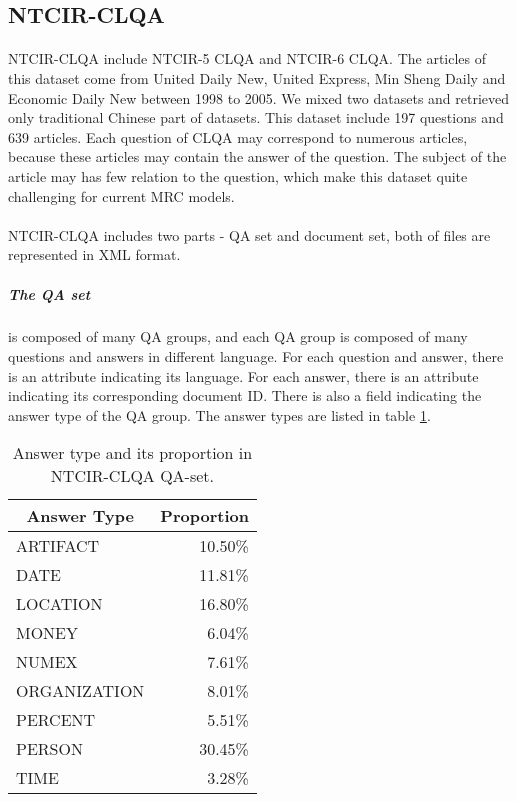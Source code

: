 \documentclass{article}
\begin{document}
\subsection{NTCIR-CLQA}
\paragraph{}
NTCIR-CLQA include NTCIR-5 CLQA\cite{sasaki2005ntcir5} and NTCIR-6\cite{sasaki2005ntcir6} CLQA. The articles of this dataset come from United Daily New, United Express, Min Sheng Daily and Economic Daily New between 1998 to 2005. We mixed two datasets and retrieved only traditional Chinese part of datasets. This dataset include 197 questions and 639 articles. Each question of CLQA may correspond to numerous articles, because these articles may contain the answer of the question. The subject of the article may has few relation to the question, which make this dataset quite challenging for current MRC models.

\paragraph{}
NTCIR-CLQA includes two parts - QA set and document set, both of files are represented in XML format.

\subparagraph{The QA set} is composed of many QA groups, and each QA group is composed of many questions and answers in different language. For each question and answer, there is an attribute indicating its language. For each answer, there is an attribute indicating its corresponding document ID. There is also a field indicating the answer type of the QA group. The answer types are listed in table \ref{tab:answer-types}.

\begin{table}[h!]
  \centering
  \begin{tabular}{lr}
    \multicolumn{1}{c}{Answer Type} & \multicolumn{1}{c}{Proportion} \\
    \toprule
    ARTIFACT & 10.50\% \\
    DATE & 11.81\% \\
    LOCATION & 16.80\% \\
    MONEY & 6.04\% \\
    NUMEX & 7.61\% \\
    ORGANIZATION & 8.01\% \\
    PERCENT & 5.51\% \\
    PERSON & 30.45\% \\
    TIME & 3.28\%
  \end{tabular}
  \caption{Answer type and its proportion in NTCIR-CLQA QA-set.}
  \label{tab:answer-types}
\end{table}
\end{document}
